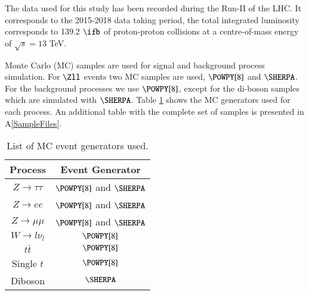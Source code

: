 The data used for this study has been recorded during the Run-II of the LHC. It corresponds to the 2015-2018 data taking period, the total integrated luminosity corresponds to 139.2 $\ifb	$ of proton-proton collisions at a centre-of-mass energy of $\sqrt{s}=13$ TeV.

Monte Carlo (MC) samples are used for signal and background process simulation. For $\Zll$ events two MC samples are used, $\POWPY[8]$ and $\SHERPA$. For the background processes we use $\POWPY[8]$, except for the di-boson samples which are simulated with $\SHERPA$. Table \ref{Table3} shows the MC generators used for each process. An additional table with the complete set of samples is presented in A\ref{SampleFiles}.

\begin{table}[htbp]
	\centering
	\begin{tabular}{cc}
		\hline
		\multicolumn{1}{|c|}{Process}  & \multicolumn{1}{c|}{Event Generator} \\ \hline
		$Z\to\tau\tau$                 & $\POWPY[8]$ and $\SHERPA$           \\
		$Z\to ee$                      & $\POWPY[8]$ and $\SHERPA$           \\
		$Z\to\mu\mu$                   & $\POWPY[8]$ and $\SHERPA$           \\
		$W\to l\nu_l$				   & $\POWPY[8]$                       \\
		$t\bar{t}$                     & $\POWPY[8]$                       \\
		Single $t$                     & $\POWPY[8]$                       \\
		Diboson                        & $\SHERPA$                       \\ \hline
	\end{tabular}
	\caption{List of MC event generators used.}
	\label{Table3}
\end{table}
